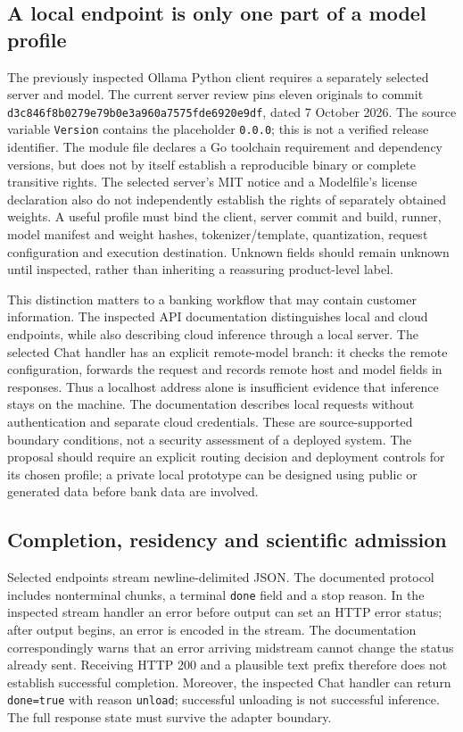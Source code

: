 \subsection{A local endpoint is only one part of a model profile}
The previously inspected Ollama Python client requires a separately selected server and model.
The current server review pins eleven originals to commit
\texttt{d3c846f8b0279e79b0e3\allowbreak{}a960a7575fde6920e9df}, dated 7 October 2026.
The source variable \texttt{Version} contains the placeholder \texttt{0.0.0}; this is not a
verified release identifier. The module file declares a Go toolchain requirement and dependency
versions, but does not by itself establish a reproducible binary or complete transitive rights.
The selected server's MIT notice and a Modelfile's license declaration also do not independently
establish the rights of separately obtained weights. A useful profile must bind the client,
server commit and build, runner, model manifest and weight hashes, tokenizer/template,
quantization, request configuration and execution destination. Unknown fields should remain
unknown until inspected, rather than inheriting a reassuring product-level label.
\citep{exec28_bp_ollama}

This distinction matters to a banking workflow that may contain customer information.
The inspected API documentation distinguishes local and cloud endpoints, while also describing
cloud inference through a local server. The selected Chat handler has an explicit remote-model
branch: it checks the remote configuration, forwards the request and records remote host and
model fields in responses. Thus a localhost address alone is insufficient evidence that inference
stays on the machine. The documentation describes local requests without authentication and
separate cloud credentials. These are source-supported boundary conditions, not a security
assessment of a deployed system. The proposal should require an explicit routing decision and
deployment controls for its chosen profile; a private local prototype can be designed using
public or generated data before bank data are involved.~\citep{exec28_bp_ollama}

\subsection{Completion, residency and scientific admission}
Selected endpoints stream newline-delimited JSON. The documented protocol includes nonterminal
chunks, a terminal \texttt{done} field and a stop reason. In the inspected stream handler an error
before output can set an HTTP error status; after output begins, an error is encoded in the
stream. The documentation correspondingly warns that an error arriving midstream cannot change
the status already sent. Receiving HTTP 200 and a plausible text prefix therefore does not
establish successful completion. Moreover, the inspected Chat handler can return
\texttt{done=true} with reason \texttt{unload}; successful unloading is not successful inference.
The full response state must survive the adapter boundary.~\citep{exec28_bp_ollama}

